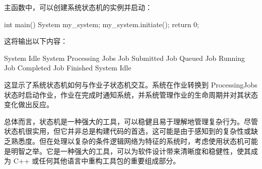 主函数中，可以创建系统状态机的实例并启动：

\begin{cpp}
int main() {
    System my_system;
    my_system.initiate();
    return 0;
}
\end{cpp}

这将输出以下内容：

\begin{shell}
System Idle
System Processing Jobs
Job Submitted
Job Queued
Job Running
Job Completed
Job Finished
System Idle
\end{shell}

这显示了系统状态机如何与作业子状态机交互。系统在作业转换到 ProcessingJobs 状态时启动作业，作业在完成时通知系统，并系统管理作业的生命周期并对其状态变化做出反应。

总体而言，状态机是一种强大的工具，可以稳健且易于理解地管理复杂行为。尽管状态机很实用，但它并非总是构建代码的首选，这可能是由于感知到的复杂性或缺乏熟悉度。但在处理以复杂的条件逻辑网络为特征的系统时，考虑使用状态机可能是明智之举。它是一种强大的工具，可以为软件设计带来清晰度和稳健性，使其成为 C++ 或任何其他语言中重构工具包的重要组成部分。
